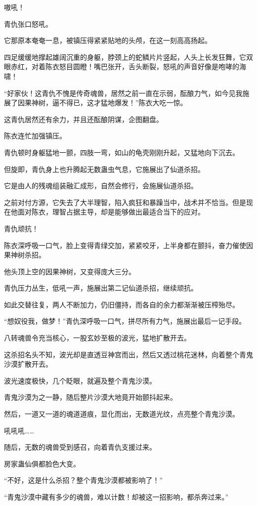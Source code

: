 \begin{this_body}
嗷吼！

青仇张口怒吼。

它那原本奄奄一息，被镇压得紧紧贴地的头颅，在这一刻高高扬起。

四足缓缓地撑起雄阔沉重的身躯，脖颈上的蛇鳞片片竖起，人头上长发狂舞，它双眼赤红，对着陈衣怒目圆瞪！嘴巴张开，舌头断裂，怒吼的声音好像是咆哮的海啸！

“好家伙！这青仇不愧是传奇魂兽，居然之前一直在示弱，酝酿力气，如今见我施展了因果神树，逼不得已，这才猛地爆发！”陈衣大吃一惊。

这青仇居然还有余力，并且还酝酿阴谋，企图翻盘。

陈衣连忙加强镇压。

青仇顿时身躯猛地一颤，四肢一弯，如山的龟壳刚刚升起，又猛地向下沉去。

但旋即，青仇身上也升腾起无数蛊虫气息，它施展出了仙道杀招。

它是由人的残魂组装融汇成形，自然会修行，会施展仙道杀招。

之前对付方源，它失去了大半理智，陷入疯狂和暴躁当中，战术并不恰当。但是现在他面对陈衣，理智占据主导，却是能够做出最适合当下的应对。

青仇顽抗！

陈衣深呼吸一口气，脸上变得青绿交加，紧紧咬牙，上半身都在颤抖，奋力催使因果神树杀招。

他头顶上空的因果神树，又变得庞大三分。

青仇压力丛生，低吼一声，施展出第二记仙道杀招，继续顽抗。

如此交替往复，两人不断加力，仍旧僵持，而各自的余力都渐渐被压榨殆尽。

“想奴役我，做梦！”青仇深呼吸一口气，拼尽所有力气，施展出最后一记手段。

八转魂兽令充当核心，一股玄妙至极的波光，猛地扩散开去。

这杀招名头不知，波光却是直透豆神宫而出，然后又透过桃花迷林，向着整个青鬼沙漠扩散开去。

波光速度极快，几个眨眼，就遍及整个青鬼沙漠。

青鬼沙漠为之一静，随后整片沙漠大地竟开始颤抖起来。

然后，一道又一道的魂道道痕，显化而出，无数道光纹，点亮整个青鬼沙漠。

吼吼吼……

随后，无数的魂兽受到感召，向着青仇支援过来。

房家蛊仙俱都脸色大变。

“不好，这是什么杀招？整个青鬼沙漠都被影响了！”

“青鬼沙漠中藏有多少的魂兽，难以计数！却被这一招影响，都杀奔过来。”


\end{this_body}
